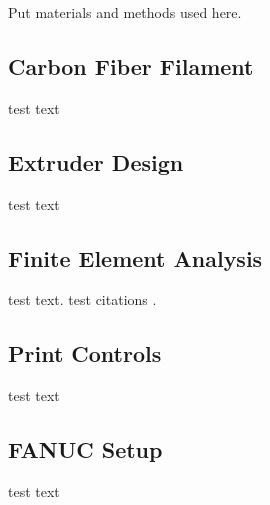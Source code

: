 

Put materials and methods used here.

\subsection*{Carbon Fiber Filament}

test text\\

\subsection*{Extruder Design}

test text\\

\subsection*{Finite Element Analysis}

test text. test citations \cite{Puck-Stuttgard,Puck-NASA}.\\

\subsection*{Print Controls}

test text\\

\subsection*{FANUC Setup}

test text\\